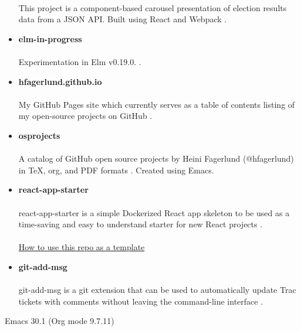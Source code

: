 \documentclass[11pt]{article}
\begin{document}
\begin{itemize}
\paragraph{}
This project is a component-based carousel presentation of election results data from a JSON API. Built using React and Webpack \cite{elections-carousel-component}.
\item \textbf{elm-in-progress}
\paragraph{}
Experimentation in Elm v0.19.0.
 \cite{elm}.
\item \textbf{hfagerlund.github.io}
\paragraph{}
My GitHub Pages site which currently serves as a table of contents listing of my open-source projects on GitHub \cite{ghpages}.
\item \textbf{osprojects}
\paragraph{}
A catalog of GitHub open source projects by Heini Fagerlund (@hfagerlund) in \TeX{}, org, and PDF formats \cite{osprojects}. Created using Emacs.
\item \textbf{react-app-starter}
\paragraph{}
react-app-starter is a simple Dockerized React app skeleton to be used as a time-saving and easy to understand starter for new React projects \cite{react-app-starter}.
\paragraph{}
\href{https://docs.github.com/en/github/creating-cloning-and-archiving-repositories/creating-a-repository-on-github/creating-a-repository-from-a-template}{How to use this repo as a template}
\item \textbf{git-add-msg}
\paragraph{}
git-add-msg is a git extension that can be used to automatically update Trac tickets with comments without leaving the command-line interface \cite{git-add-msg}.
\end{itemize}


\begin{LaTeX}
\begin{sloppypar}


\end{sloppypar}
\end{LaTeX}
Emacs 30.1 (Org mode 9.7.11)
\end{document}
